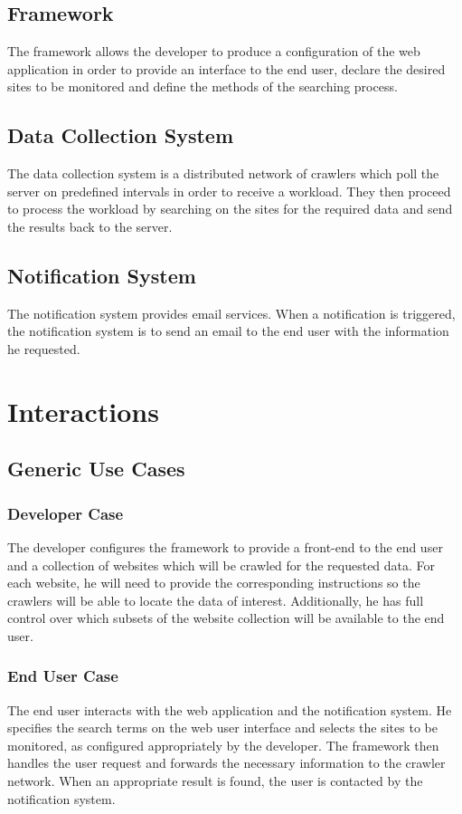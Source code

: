 \documentclass[a4paper,10pt]{article} \usepackage{anysize}
\begin{document}
    \subsection{Framework}
        The framework allows the developer to produce a configuration of the
        web application in order to provide an interface to the end user,
        declare the desired sites to be monitored and define the methods of
        the searching process.
    \subsection{Data Collection System}
        The data collection system is a distributed network of crawlers which
        poll the server on predefined intervals in order to receive a
        workload. They then proceed to process the workload by searching on
        the sites for the required data and send the results back to the
        server.
    \subsection{Notification System}
        The notification system provides email services. When a notification
        is triggered, the notification system is to send an email to the end
        user with the information he requested.
\section{Interactions}
    \subsection{Generic Use Cases}
        \subsubsection{Developer Case}
            The developer configures the framework to provide a front-end to
            the end user and a collection of websites which will be crawled
            for the requested data. For each website, he will need to provide
            the corresponding instructions so the crawlers will be able to
            locate the data of interest. Additionally, he has full control
            over which subsets of the website collection will be available to
            the end user.
        \subsubsection{End User Case}
            The end user interacts with the web application and the
            notification system. He specifies the search terms on the web user
            interface and selects the sites to be monitored, as configured
            appropriately by the developer. The framework then handles the
            user request and forwards the necessary information to the crawler
            network. When an appropriate result is found, the user is contacted
            by the notification system.
\end{document}
